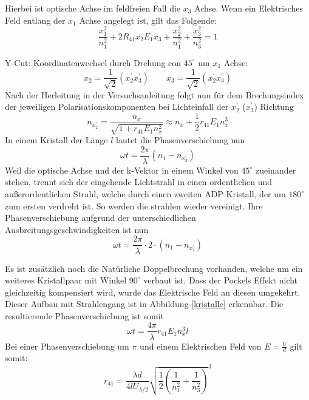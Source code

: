 Hierbei ist optische Achse im feldfreien Fall die $x_3$ Achse. 	Wenn ein Elektrisches Feld entlang der $x_1$ Achse angelegt ist, gilt das Folgende:
\begin{equation}
		\frac{x_1^2}{n_1^2} + 2 R_{41} x_2 E_1 x_3 + \frac{x_2^2}{n_1^2}+  \frac{x_3^2}{n_3^2} = 1
\end{equation}

Y-Cut: Koordinatenwechsel durch Drehung con $45^\circ$ um $x_1$ Achse:
\begin{equation}
	x_2 = \frac{1}{\sqrt{2}} \left(x_2^\prime x_3^\prime \right) \qquad
	x_3 = \frac{1}{\sqrt{2}} \left(x_2^\prime x_3^\prime \right) 
\end{equation}
Nach der Herleitung in der Versuchsanleitung \cite{anleitung} folgt nun für dem Brechungsindex der jeweiligen Polarisationskomponenten bei Lichteinfall der $x_2^\prime$ ($x_3^\prime$) Richtung 
\begin{equation}
n_{x_2^\prime} = \frac{n_x}{\sqrt{1+ r_{41}E_1 n_x^2}} \approx n_x + \frac{1}{2}r_{41}E_1 n_x^3
\end{equation}
In einem Kristall der Länge $l$ lautet die Phasenverschiebung nun
\begin{equation}
\omega t = \frac{2\pi}{\lambda}\left(n_1 - n_{x_2^\prime}\right)
\end{equation}
Weil die optische Achse und der k-Vektor in einem Winkel von $45^\circ$ zueinander stehen, trennt sich der eingehende Lichtstrahl in einen ordentlichen und außerordentlichen Strahl, welche durch einen zweiten ADP Kristall, der um $180^\circ$ zum ersten verdreht ist. So werden die strahlen wieder vereinigt. Ihre Phasenverschiebung aufgrund der unterschiedlichen Ausbreitungsgeschwindigkeiten ist nun 
\begin{equation}
\omega t = \frac{2\pi}{\lambda}\cdot2\cdot\left(n_1 - n_{x_2^\prime}\right)
\end{equation}

Es ist zusätzlich noch die Natürliche Doppelbrechung vorhanden, welche um ein weiteres Kristallpaar mit Winkel $90^\circ$ verbaut ist. Dass der Pockels Effekt nicht gleichzeitig kompensiert wird, wurde das Elektrische Feld an diesen umgekehrt. Dieser Aufbau mit Strahlengang ist in Abbildung \ref{kristalle} erkennbar. Die resultierende Phasenverschiebung ist somit 
\begin{equation}
\omega t = \frac{4\pi}{\lambda}r_{41} E_1 n_x^3 l
\end{equation}
Bei einer Phasenverschiebung um $\pi$ und einem Elektrischen Feld von $E= \frac{U}{d}$ gilt somit:
\begin{equation}
\label{pockelsgleichung}
r_{41} = \frac{\lambda d}{4 l U_{\lambda/2}} \sqrt{\frac{1}{2}\left(\frac{1}{n_1^2}+\frac{1}{n_3^2}\right)}^3
\end{equation}


